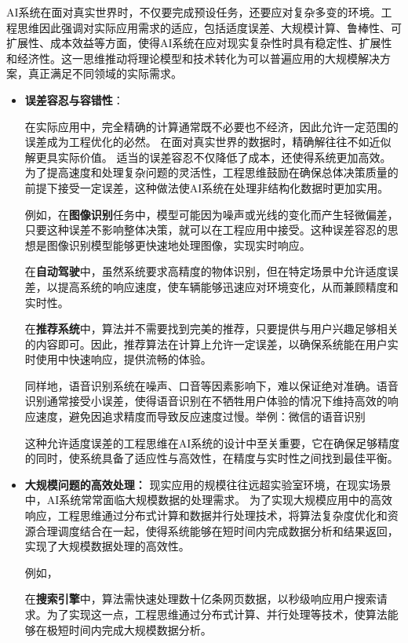 AI系统在面对真实世界时，不仅要完成预设任务，还要应对复杂多变的环境。工程思维因此强调对实际应用需求的适应，包括适度误差、大规模计算、鲁棒性、可扩展性、成本效益等方面，使得AI系统在应对现实复杂性时具有稳定性、扩展性和经济性。这一思维推动将理论模型和技术转化为可以普遍应用的大规模解决方案，真正满足不同领域的实际需求。

\begin{itemize}
\item {\bf 误差容忍与容错性}：

在实际应用中，完全精确的计算通常既不必要也不经济，因此允许一定范围的误差成为工程优化的必然。
在面对真实世界的数据时，精确解往往不如近似解更具实际价值。
适当的误差容忍不仅降低了成本，还使得系统更加高效。为了提高速度和处理复杂问题的灵活性，工程思维鼓励在确保总体决策质量的前提下接受一定误差，这种做法使AI系统在处理非结构化数据时更加实用。

例如，在{\bf 图像识别}任务中，模型可能因为噪声或光线的变化而产生轻微偏差，只要这种误差不影响整体决策，就可以在工程应用中接受。这种误差容忍的思想是图像识别模型能够更快速地处理图像，实现实时响应。

在{\bf 自动驾驶}中，虽然系统要求高精度的物体识别，但在特定场景中允许适度误差，以提高系统的响应速度，使车辆能够迅速应对环境变化，从而兼顾精度和实时性。

在{\bf 推荐系统}中，算法并不需要找到完美的推荐，只要提供与用户兴趣足够相关的内容即可。因此，推荐算法在计算上允许一定误差，以确保系统能在用户实时使用中快速响应，提供流畅的体验。

同样地，语音识别系统在噪声、口音等因素影响下，难以保证绝对准确。语音识别通常接受小误差，使得语音识别在不牺牲用户体验的情况下维持高效的响应速度，避免因追求精度而导致反应速度过慢。{举例：微信的语音识别}

这种允许适度误差的工程思维在AI系统的设计中至关重要，它在确保足够精度的同时，使系统具备了适应性与高效性，在精度与实时性之间找到最佳平衡。

\item {\bf 大规模问题的高效处理：}
现实应用的规模往往远超实验室环境，在现实场景中，AI系统常常面临大规模数据的处理需求。
为了实现大规模应用中的高效响应，工程思维通过分布式计算和数据并行处理技术，将算法复杂度优化和资源合理调度结合在一起，使得系统能够在短时间内完成数据分析和结果返回，实现了大规模数据处理的高效性。

例如，

在{\bf 搜索引擎}中，算法需快速处理数十亿条网页数据，以秒级响应用户搜索请求。为了实现这一点，工程思维通过分布式计算、并行处理等技术，使算法能够在极短时间内完成大规模数据分析。


\end{itemize}
